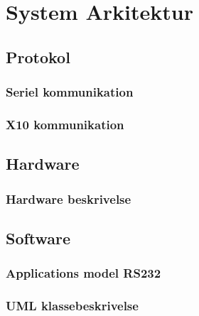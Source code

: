 \chapter{System Arkitektur}

\section{Protokol}

\subsection{Seriel kommunikation}


\newpage
\subsection{X10 kommunikation}


\newpage
\section{Hardware}

\subsection{Hardware beskrivelse}


\newpage
\section{Software}
\subsection{Applications model RS232}

\clearpage
\subsection{UML klassebeskrivelse}
